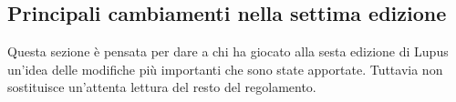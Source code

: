 \documentclass[a4paper,10pt]{article}
\begin{document}
% 
% 
% 
% 

\subsection{Principali cambiamenti nella settima edizione}
 
Questa sezione è pensata per dare a chi ha giocato alla sesta edizione di Lupus un'idea delle modifiche più importanti che sono state apportate. Tuttavia non sostituisce un'attenta lettura del resto del regolamento.
 
\end{document}
